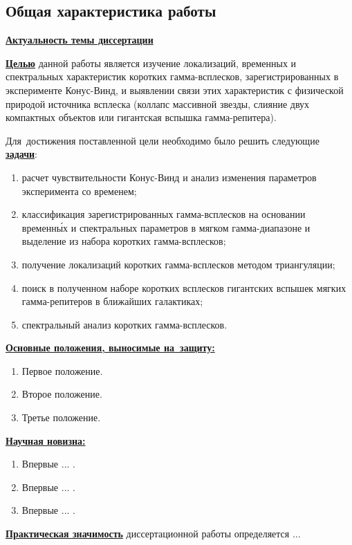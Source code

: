 \subsection*{\Large Общая характеристика работы}
\fontsize{14pt}{15pt}\selectfont
\underline{\textbf{Актуальность темы диссертации}}

\underline{\textbf{Целью}} данной работы является изучение локализаций, временных и спектральных характеристик 
коротких гамма-всплесков, зарегистрированных в эксперименте Конус-Винд, и выявлении 
связи этих характеристик с физической природой источника всплеска 
(коллапс массивной звезды, слияние двух компактных объектов или гигантская вспышка гамма-репитера).

Для~достижения поставленной цели необходимо было решить следующие \underline{\textbf{задачи}}:
\begin{enumerate}
 \item расчет чувствительности Конус-Винд и анализ изменения параметров эксперимента со временем;
 \item классификация зарегистрированных гамма-всплесков на основании временн\'{ы}х 
      и спектральных параметров в мягком гамма-диапазоне и выделение из набора коротких гамма-всплесков; 
 \item получение локализаций коротких гамма-всплесков методом триангуляции; 
 \item поиск в полученном наборе коротких всплесков гигантских 
      вспышек мягких гамма-репитеров в ближайших галактиках;
 \item спектральный анализ коротких гамма-всплесков.
\end{enumerate}

\underline{\textbf{Основные положения, выносимые на~защиту:}}
\begin{enumerate}
 \item Первое положение.
 \item Второе положение.
 \item Третье положение.
\end{enumerate}

\underline{\textbf{Научная новизна:}}
\begin{enumerate}
 \item Впервые ... . 
 \item Впервые ... .
 \item Впервые ... . 
\end{enumerate}

\underline{\textbf{Практическая значимость}} диссертационной работы определяется ...

